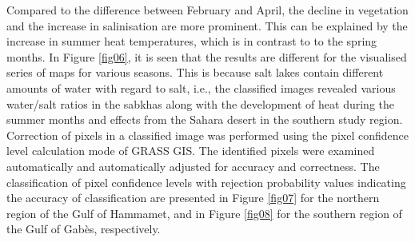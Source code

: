 \documentclass[land,article,accept,pdftex,moreauthors]{Definitions/mdpi}
\begin{document}
Compared to the difference between February and April{, }the decline in vegetation and {the }increase in salinisation {are} more prominent{. This can be explained by the }increase in summer heat temperatures, which {is} in contrast to to the spring months. In Figure \ref{fig06}, it is seen that the results {are }different for {the }visualised series of maps for various seasons{. This is }because salt lakes contain different amounts of water with regard to salt, i.e., the classified images revealed various water/salt ratios in the sabkhas along with the development of heat during the summer months and effects from the Sahara desert in the southern study region. {Correction of pixels in a classified image was performed using the pixel confidence level calculation mode of GRASS GIS. The identified pixels were examined automatically and automatically adjusted for accuracy and correctness. }The classification of pixel confidence levels with rejection probability values indicating the accuracy of classification are presented in Figure \ref{fig07} for the northern region of the Gulf of Hammamet, and in Figure \ref{fig08} for the southern region of the Gulf of Gabès, respectively.  
\end{document}
